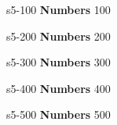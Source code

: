 \documentclass{beamer}
\def \fifthcat {\textbf{Numbers}}
\begin{document}
	
	\content                       
	{s5-100}                     
	{\fifthcat}                          
	{100}{ 
	  
	}
	
	
	\content                       
	{s5-200}                     
	{\fifthcat}                          
	{200}{   
	
		}
	
	
	\content           
	{s5-300}                     
	{\fifthcat}                          
	{300}{     
	
		}
	
	
	\content                       
	{s5-400}                     
	{\fifthcat}                          
	{400}{ 
	     
	}
	
	
	\content                       
	{s5-500}                     
	{\fifthcat}                          
	{500}{   

	}
\end{document}
